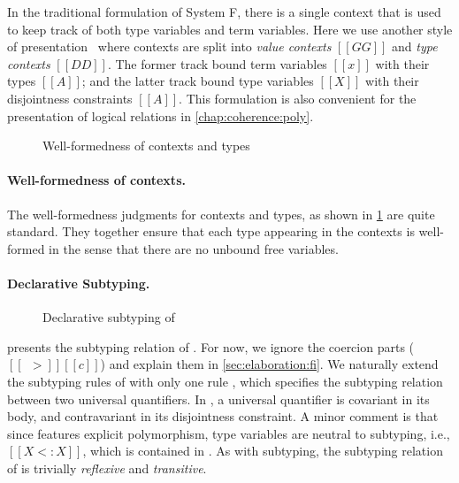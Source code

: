 In the traditional formulation of System F, there is a single context that is
used to keep track of both type variables and term variables. Here we use
another style of presentation~\citep[chap. 16]{Harper_2016} where contexts are
split into \textit{value contexts} $[[GG]]$ and \textit{type contexts} $[[DD]]$.
The former track bound term variables $[[x]]$ with their types $[[A]]$; and the
latter track bound type variables $[[X]]$ with their disjointness constraints
$[[A]]$. This formulation is also convenient for the presentation of logical
relations in \cref{chap:coherence:poly}.

\begin{figure}
  \centering
  \caption{Well-formedness of contexts and types}
  \label{fig:well-formedness:fi}
\end{figure}

\paragraph{Well-formedness of contexts.}

The well-formedness judgments for contexts and types, as shown in
\cref{fig:well-formedness:fi} are quite standard. They together ensure that each
type appearing in the contexts is well-formed in the sense that there are no
unbound free variables.


\paragraph{Declarative Subtyping.}


\begin{figure}[h]
  \centering
  \caption{Declarative subtyping of \fnamee}
  \label{fig:subtyping:fi}
\end{figure}

 presents the subtyping relation of \fnamee. For now, we
ignore the coercion parts ($[[~~>]] [[c]]$) and explain them in
\cref{sec:elaboration:fi}. We naturally extend the subtyping rules of \namee
with only one rule , which specifies the subtyping relation
between two universal quantifiers. In , a universal quantifier
is covariant in its body, and contravariant in its disjointness constraint. A
minor comment is that since \fnamee features explicit polymorphism, type
variables are neutral to subtyping, i.e., $[[X <: X]]$, which is contained in
. As with \namee subtyping, the subtyping relation of \fnamee is
trivially \textit{reflexive} and \textit{transitive}.

